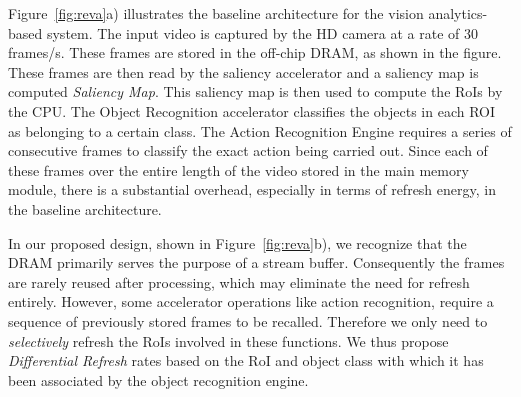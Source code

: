 
\begin{figure*}[ht!]
\begin{minipage}[b]{0.36\linewidth}
\raggedleft
{}
\caption{\label{fig:reva}a) Baseline architecture}
\end{minipage}
\addtocounter{figure}{-1}
\begin{minipage}[b]{0.37\linewidth}
\centering
{}
\caption{\label{fig:reva}b) Architecture of Proposed System}
\end{minipage}
\addtocounter{figure}{-1}
\begin{minipage}[b]{0.25\linewidth}
\raggedright
{}
\caption{\label{fig:reva}c) Design of REVA block}
\end{minipage}
\end{figure*}


Figure~\ref{fig:reva}a) illustrates the baseline architecture for the vision analytics-based system. The input video is captured by the HD camera at a rate of 30 frames/s. 
These frames are stored in the off-chip DRAM, as shown in the figure. These frames are then read by the saliency accelerator and a saliency map is computed \emph{Saliency Map}. This saliency map is then used to compute the RoIs by the CPU. The Object Recognition accelerator classifies the objects in each ROI as belonging to a certain class. The Action Recognition Engine requires a series of consecutive frames to classify the exact action being carried out. Since each of these frames over the entire length of the video stored in the main memory module, there is a substantial overhead, especially in terms of refresh energy, in the baseline architecture. 

In our proposed design, shown in Figure~\ref{fig:reva}b), we recognize that the DRAM primarily serves the purpose of a stream buffer. Consequently the frames are rarely reused after processing, which may eliminate the need for refresh entirely. 
However, some accelerator operations like action recognition, require a sequence of previously stored frames to be recalled. Therefore we only need to \emph{selectively} refresh the RoIs involved in these functions. We thus propose \emph{Differential Refresh} rates based on the RoI and object class with which it has been associated by the object recognition engine.


